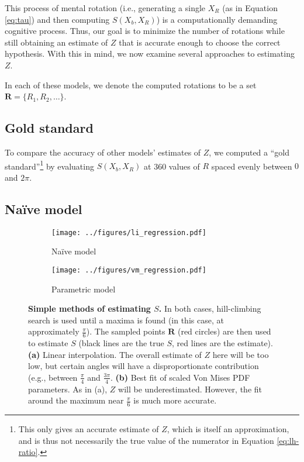 \documentclass{article} %
\newcommand{\Naive}[0]{Na\"ive}
\begin{document}
This process of mental rotation (i.e., generating a single $X_R$ (as
in Equation \ref{eq:tau}) and then computing $S(X_b, X_R)$) is a
computationally demanding cognitive process. Thus, our goal is to
minimize the number of rotations while still obtaining an estimate of
$Z$ that is accurate enough to choose the correct hypothesis. With
this in mind, we now examine several approaches to estimating $Z$.

In each of these models, we denote the computed rotations to be a set
$\mathbf{R}=\{R_1, R_2, \ldots{}\}$.

\subsection{Gold standard}

To compare the accuracy of other models' estimates of $Z$, we computed
a ``gold standard''\footnote{This only gives an accurate estimate of
  $Z$, which is itself an approximation, and is thus not necessarily
  the true value of the numerator in Equation \ref{eq:lh-ratio}.} by
evaluating $S(X_b, X_R)$ at 360 values of $R$ spaced evenly between
$0$ and $2\pi$.

\subsection{\Naive{} model}

\begin{figure}[t]
  \centering
  \begin{subfigure}[b]{0.45\textwidth}
    \centering
    \texttt{[image: ../figures/li\_regression.pdf]}
    \caption{\Naive{} model}
    \label{fig:li}
  \end{subfigure}
  \begin{subfigure}[b]{0.45\textwidth}
    \centering
    \texttt{[image: ../figures/vm\_regression.pdf]}
    \caption{Parametric model}
    \label{fig:vm}
  \end{subfigure}
  \caption{\textbf{Simple methods of estimating $S$.} In both cases,
    hill-climbing search is used until a maxima is found (in this
    case, at approximately $\frac{\pi}{6}$). The sampled points
    $\mathbf{R}$ (red circles) are then used to estimate $S$ (black
    lines are the true $S$, red lines are the estimate). \textbf{(a)}
    Linear interpolation. The overall estimate of $Z$ here will be too
    low, but certain angles will have a disproportionate contribution
    (e.g., between $\frac{\pi}{4}$ and $\frac{3\pi}{4}$. \textbf{(b)}
    Best fit of scaled Von Mises PDF parameters. As in (a), $Z$ will
    be underestimated. However, the fit around the maximum near
    $\frac{\pi}{6}$ is much more accurate.}
  \label{fig:simple-models}
\end{figure}
\end{document}
